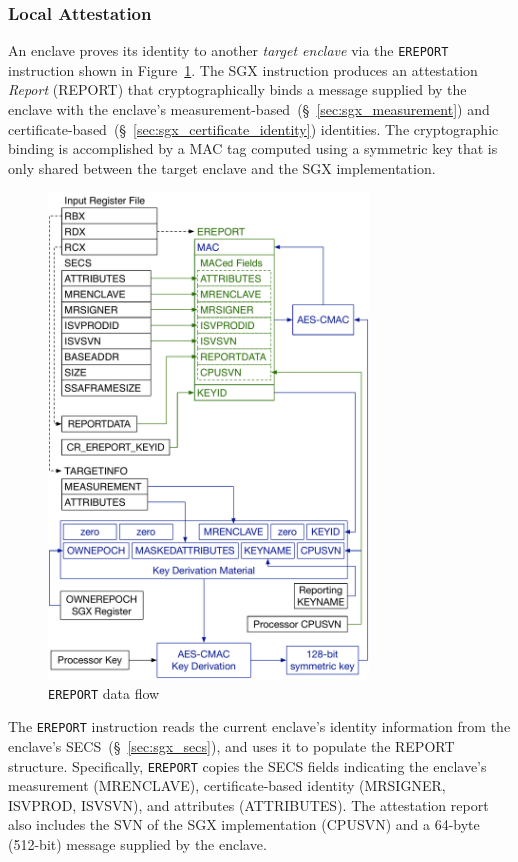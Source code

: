 \subsubsection{Local Attestation}
\label{sec:sgx_ereport}


An enclave proves its identity to another \textit{target enclave} via the
\texttt{EREPORT} instruction shown in Figure~\ref{fig:sgx_ereport}. The SGX
instruction produces an attestation \textit{Report} (REPORT) that
cryptographically binds a message supplied by the enclave with the enclave's
measurement-based~(\S~\ref{sec:sgx_measurement}) and
certificate-based~(\S~\ref{sec:sgx_certificate_identity}) identities. The
cryptographic binding is accomplished by a MAC tag computed using a symmetric
key that is only shared between the target enclave and the SGX implementation.

\begin{figure}[hbt]
  \centering
  \includegraphics[width=85mm]{figures/sgx_ereport.pdf}
  \caption{
    \texttt{EREPORT} data flow
  }
  \label{fig:sgx_ereport}
\end{figure}

The \texttt{EREPORT} instruction reads the current enclave's identity
information from the enclave's SECS~(\S~\ref{sec:sgx_secs}), and uses it to
populate the REPORT structure. Specifically, \texttt{EREPORT} copies the
SECS fields indicating the enclave's measurement (MRENCLAVE), certificate-based
identity (MRSIGNER, ISVPROD, ISVSVN), and attributes (ATTRIBUTES). The
attestation report also includes the SVN of the SGX implementation (CPUSVN)
and a 64-byte (512-bit) message supplied by the enclave.

